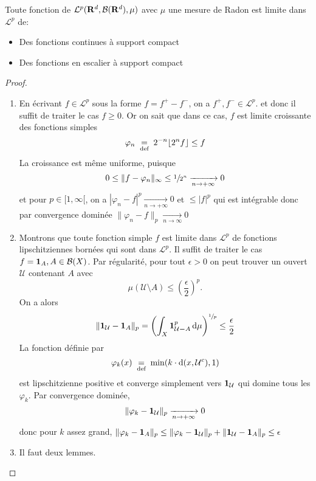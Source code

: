 
\begin{cor}
    Toute fonction de $\mathcal  L^p(\mathbf R^d, \mathcal  B(\mathbf R^d), \mu)$ avec $\mu$ une mesure de Radon est limite dans  $ \mathcal  L^p$ de: \begin{itemize}
        \item Des fonctions continues à support compact
        \item Des fonctions en escalier à support compact
    \end{itemize}
\end{cor}

\begin{proof}
\begin{enumerate}
    \item En écrivant $f\in \mathcal L^p$ sous la forme $f=f^+-f^-$, on a $f^+,f^-\in \mathcal L^p$. et donc il suffit de traiter le cas $f\geq 0$.
        Or on sait que dans ce cas, $f$ est limite croissante des fonctions simples \[\varphi_n\;\underset{\text{def}}=\; 2^{-n}\lfloor 2^nf\rfloor  \leq f\]
        La croissance est même uniforme, puisque \[0\leq \|f-\varphi_n\|_{\infty}\leq  \sfrac{1}{2^n} \xrightarrow[n\to+\infty]{} 0\]
et pour $p\in [1,\infty[$, on a $|\varphi_n-f|^p \xrightarrow[n\to+\infty]{} 0$ et $\leq |f|^p$ qui est intégrable donc par convergence dominée $\|\varphi_n-f\|_p \xrightarrow[n\to\infty]{} 0$

\item Montrons que toute fonction simple $f$ est limite dans  $\mathcal  L^p$ de fonctions lipschitziennes bornées qui sont dans $ \mathcal  L^p$. Il suffit de traiter le cas $f=\bm{1}_A, A \in  \mathcal  B(X)$. Par régularité, pour tout $\epsilon>0$ on peut trouver un ouvert $\mathcal  U$ contenant $A$ avec  \[
        \mu(\mathcal  U \setminus  A)\leq \left( \frac\epsilon2 \right)^p.
\] 
On a alors \[ \|\bm{1}_{\mathcal  U}-\bm{1}_A\|_p= \left( \int_X \bm{1}_{\mathcal  U\bm-  A}^p\mathop{}\!\mathrm d\mu \right)^{\sfrac1p}\leq \frac\epsilon2\]
La fonction définie par \[
    \varphi_k(x)\;\underset{\text{def}}=\; \min(k\cdot \mathrm d(x, \mathcal  U^c), 1)
\] 
est lipschitzienne positive et converge simplement vers $\bm{1}_{\mathcal  U}$ qui domine tous les $\varphi_k$. Par convergence dominée, \[
    \|\varphi_k-\bm{1}_{\mathcal  U}\|_p \xrightarrow[n\to+\infty]{}0
\]
donc pour $k$ assez grand,  $\|\varphi_k-\bm{1}_A\|_p\leq \|\varphi_k-\bm{1}_{\mathcal  U}\|_p+ \|\bm{1}_{\mathcal  U}-\bm{1}_A\|_p\leq \epsilon$

\item Il faut deux lemmes.
\end{enumerate}
\end{proof}


